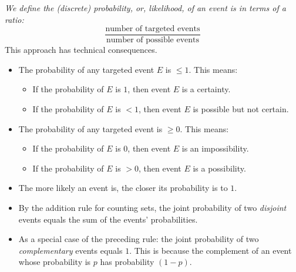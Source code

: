 \bigskip

\noindent
{\em We define the (discrete) probability, or, likelihood, of an event is in terms of a ratio:}
\[ 
\frac{\mbox{number of targeted events}}{\mbox{number of possible events}}
\]
This approach has technical consequences.
  \begin{itemize}
  \item
The probability of any targeted event $E$ is $\leq 1$.  This means:
    \begin{itemize}
    \item
If the probability of $E$ is $1$, then event $E$ is a certainty.
    \item
If the probability of $E$ is $< 1$, then event $E$ is possible but not certain.
   \end{itemize}

 \item
The probability of any targeted event is $\geq 0$.   This means:
    \begin{itemize}
    \item
If the probability of $E$ is $0$, then event $E$ is an impossibility.
    \item
If the probability of $E$ is $> 0$, then event $E$ is a possibility.
   \end{itemize}

  \item
The more likely an event is, the closer its probability is to $1$.
  \item
By the addition rule for counting sets, the joint probability of two {\em disjoint} events
equals the sum of the events' probabilities.
  \item
As a special case of the preceding rule: the joint probability of two {\em complementary} events
equals $1$.  This is because the complement of an event whose probability is $p$ has
probability  $(1-p)$.
  \end{itemize}

\bigskip

\noindent {}


